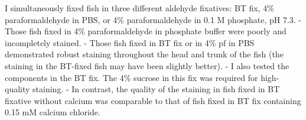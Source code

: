 \documentclass[
  letterpaper,
  DIV=11,
  numbers=noendperiod]{scrreprt}
\begin{document}
\begin{tcolorbox}[enhanced jigsaw, rightrule=.15mm, title=\textcolor{quarto-callout-note-color}{\faInfo}\hspace{0.5em}{Composition of fixative}, titlerule=0mm, opacitybacktitle=0.6, toprule=.15mm, bottomrule=.15mm, opacityback=0, left=2mm, colframe=quarto-callout-note-color-frame, breakable, coltitle=black, colback=white, colbacktitle=quarto-callout-note-color!10!white, bottomtitle=1mm, leftrule=.75mm, toptitle=1mm, arc=.35mm]

I simultaneously fixed fish in three different aldehyde fixatives: BT
fix, 4\% paraformaldehyde in PBS, or 4\% paraformaldehyde in 0.1 M
phosphate, pH 7.3. - Those fish fixed in 4\% paraformaldehyde in
phosphate buffer were poorly and incompletely stained. - Those fish
fixed in BT fix or in 4\% pf in PBS demonstrated robust staining
throughout the head and trunk of the fish (the staining in the BT-fixed
fish may have been slightly better). - I also tested the components in
the BT fix. The 4\% sucrose in this fix was required for high-quality
staining. - In contrast, the quality of the staining in fish fixed in BT
fixative without calcium was comparable to that of fish fixed in BT fix
containing 0.15 mM calcium chloride.

\end{tcolorbox}
\end{document}
